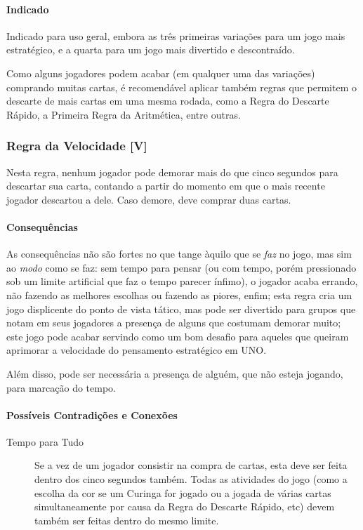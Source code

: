 \paragraph{Indicado} 

Indicado para uso geral, embora as três primeiras variações para um jogo mais estratégico, e a quarta para um jogo mais divertido e descontraído.

Como alguns jogadores podem acabar (em qualquer uma das variações) comprando muitas cartas, é recomendável aplicar também regras que permitem o descarte de mais cartas em uma mesma rodada, como a Regra do Descarte Rápido, a Primeira Regra da Aritmética, entre outras.

\subsubsection{Regra da Velocidade [V]}

Nesta regra, nenhum jogador pode demorar mais do que cinco segundos para descartar sua carta, contando a partir do momento em que o mais recente jogador descartou a dele. Caso demore, deve comprar duas cartas.

\paragraph{Consequências}

As consequências não são fortes no que tange àquilo que se \emph{faz} no jogo, mas sim ao \emph{modo} como se faz: sem tempo para pensar (ou com tempo, porém pressionado sob um limite artificial que faz o tempo parecer ínfimo), o jogador acaba errando, não fazendo as melhores escolhas ou fazendo as piores, enfim; esta regra cria um jogo displicente do ponto de vista tático, mas pode ser divertido para grupos que notam em seus jogadores a presença de alguns que costumam demorar muito; este jogo pode acabar servindo como um bom desafio para aqueles que queiram aprimorar a velocidade do pensamento estratégico em UNO.

Além disso, pode ser necessária a presença de alguém, que não esteja jogando, para marcação do tempo.

\paragraph{Possíveis Contradições e Conexões}

\begin{description}
\item[Tempo para Tudo]{Se a vez de um jogador consistir na compra de cartas, esta deve ser feita dentro dos cinco segundos também. Todas as atividades do jogo (como a escolha da cor se um Curinga for jogado ou a jogada de várias cartas simultaneamente por causa da Regra do Descarte Rápido, etc) devem também ser feitas dentro do mesmo limite.}
\end{description}

